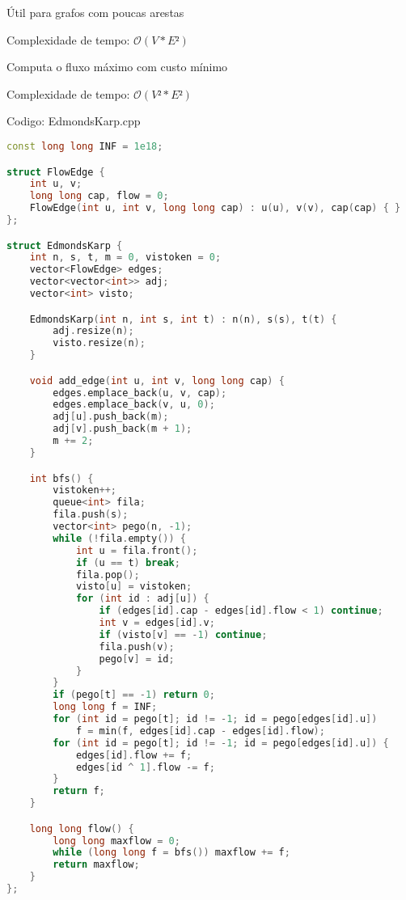 \documentclass[10pt, a4paper, oneside]{book}
\begin{document}
\textbf{} 


Útil para grafos com poucas arestas



Complexidade de tempo: $\mathcal{O}(V * E²)$



\textbf{} 


Computa o fluxo máximo com custo mínimo



Complexidade de tempo: $\mathcal{O}(V² * E²)$

\hfill

Codigo: EdmondsKarp.cpp

\begin{lstlisting}[language=C++]
const long long INF = 1e18;

struct FlowEdge {
    int u, v;
    long long cap, flow = 0;
    FlowEdge(int u, int v, long long cap) : u(u), v(v), cap(cap) { }
};

struct EdmondsKarp {
    int n, s, t, m = 0, vistoken = 0;
    vector<FlowEdge> edges;
    vector<vector<int>> adj;
    vector<int> visto;

    EdmondsKarp(int n, int s, int t) : n(n), s(s), t(t) {
        adj.resize(n);
        visto.resize(n);
    }

    void add_edge(int u, int v, long long cap) {
        edges.emplace_back(u, v, cap);
        edges.emplace_back(v, u, 0);
        adj[u].push_back(m);
        adj[v].push_back(m + 1);
        m += 2;
    }

    int bfs() {
        vistoken++;
        queue<int> fila;
        fila.push(s);
        vector<int> pego(n, -1);
        while (!fila.empty()) {
            int u = fila.front();
            if (u == t) break;
            fila.pop();
            visto[u] = vistoken;
            for (int id : adj[u]) {
                if (edges[id].cap - edges[id].flow < 1) continue;
                int v = edges[id].v;
                if (visto[v] == -1) continue;
                fila.push(v);
                pego[v] = id;
            }
        }
        if (pego[t] == -1) return 0;
        long long f = INF;
        for (int id = pego[t]; id != -1; id = pego[edges[id].u])
            f = min(f, edges[id].cap - edges[id].flow);
        for (int id = pego[t]; id != -1; id = pego[edges[id].u]) {
            edges[id].flow += f;
            edges[id ^ 1].flow -= f;
        }
        return f;
    }

    long long flow() {
        long long maxflow = 0;
        while (long long f = bfs()) maxflow += f;
        return maxflow;
    }
};
\end{lstlisting}
\hfill
\end{document}
